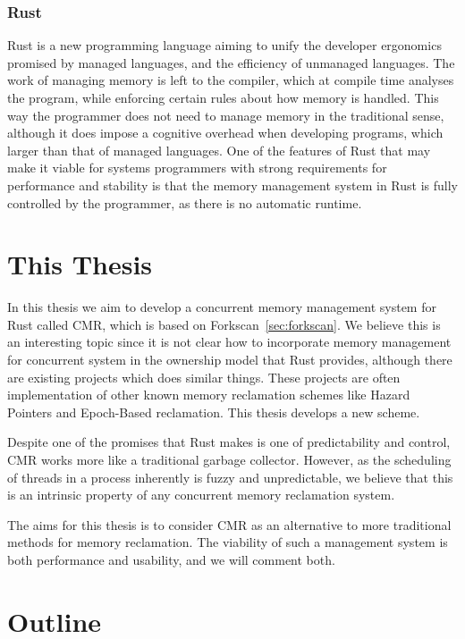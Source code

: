 \subsubsection{Rust}

Rust is a new programming language aiming to unify the developer ergonomics promised by managed
languages, and the efficiency of unmanaged languages. The work of managing memory is left to the
compiler, which at compile time analyses the program, while enforcing certain rules about how
memory is handled. This way the programmer does not need to manage memory in the traditional sense,
although it does impose a cognitive overhead when developing programs, which larger than that of
managed languages. One of the features of Rust that may make it viable for systems programmers with
strong requirements for performance and stability is that the memory management system in Rust is
fully controlled by the programmer, as there is no automatic runtime.


\section{This Thesis}

In this thesis we aim to develop a concurrent memory management system for Rust called CMR\@, which
is based on Forkscan~\ref{sec:forkscan}. We believe this is an interesting topic since it is not
clear how to incorporate memory management for concurrent system in the ownership model that Rust
provides, although there are existing projects which does similar things. These projects are often
implementation of other known memory reclamation schemes like Hazard Pointers and Epoch-Based
reclamation. This thesis develops a new scheme.

Despite one of the promises that Rust makes is one of predictability and control, CMR works more
like a traditional garbage collector. However, as the scheduling of threads in a process inherently
is fuzzy and unpredictable, we believe that this is an intrinsic property of any concurrent memory
reclamation system.

The aims for this thesis is to consider CMR as an alternative to more traditional methods for
memory reclamation. The viability of such a management system is both performance and usability,
and we will comment both.


\section{Outline}

